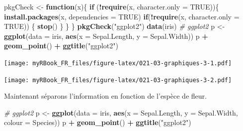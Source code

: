 \documentclass[]{book}
\newenvironment{Shaded}{\begin{snugshade}}{\end{snugshade}}
\newcommand{\CommentTok}[1]{\textcolor[rgb]{0.56,0.35,0.01}{\textit{#1}}}
\newcommand{\ControlFlowTok}[1]{\textcolor[rgb]{0.13,0.29,0.53}{\textbf{#1}}}
\newcommand{\DataTypeTok}[1]{\textcolor[rgb]{0.13,0.29,0.53}{#1}}
\newcommand{\DecValTok}[1]{\textcolor[rgb]{0.00,0.00,0.81}{#1}}
\newcommand{\KeywordTok}[1]{\textcolor[rgb]{0.13,0.29,0.53}{\textbf{#1}}}
\newcommand{\NormalTok}[1]{#1}
\newcommand{\OperatorTok}[1]{\textcolor[rgb]{0.81,0.36,0.00}{\textbf{#1}}}
\newcommand{\OtherTok}[1]{\textcolor[rgb]{0.56,0.35,0.01}{#1}}
\newcommand{\StringTok}[1]{\textcolor[rgb]{0.31,0.60,0.02}{#1}}
\begin{document}
\begin{Shaded}
\begin{Highlighting}[]
\NormalTok{pkgCheck <-}\StringTok{ }\ControlFlowTok{function}\NormalTok{(x)\{ }
    \ControlFlowTok{if}\NormalTok{ (}\OperatorTok{!}\KeywordTok{require}\NormalTok{(x, }\DataTypeTok{character.only =} \OtherTok{TRUE}\NormalTok{))\{}
        \KeywordTok{install.packages}\NormalTok{(x, }\DataTypeTok{dependencies =} \OtherTok{TRUE}\NormalTok{)}
        \ControlFlowTok{if}\NormalTok{(}\OperatorTok{!}\KeywordTok{require}\NormalTok{(x, }\DataTypeTok{character.only =} \OtherTok{TRUE}\NormalTok{)) \{}
            \KeywordTok{stop}\NormalTok{()}
\NormalTok{        \}}
\NormalTok{    \}}
\NormalTok{\}}
\KeywordTok{pkgCheck}\NormalTok{(}\StringTok{"ggplot2"}\NormalTok{)}
\KeywordTok{data}\NormalTok{(iris)}
\CommentTok{# ggplot2}
\NormalTok{p <-}\StringTok{ }\KeywordTok{ggplot}\NormalTok{(}\DataTypeTok{data =}\NormalTok{ iris, }\KeywordTok{aes}\NormalTok{(}\DataTypeTok{x =}\NormalTok{ Sepal.Length, }\DataTypeTok{y =}\NormalTok{ Sepal.Width))}
\NormalTok{p }\OperatorTok{+}\StringTok{ }\KeywordTok{geom_point}\NormalTok{() }\OperatorTok{+}\StringTok{ }\KeywordTok{ggtitle}\NormalTok{(}\StringTok{"ggplot2"}\NormalTok{)}
\end{Highlighting}
\end{Shaded}

\texttt{[image: myRBook\_FR\_files/figure-latex/021-03-graphiques-3-1.pdf]}

\begin{Shaded}
\end{Shaded}

\texttt{[image: myRBook\_FR\_files/figure-latex/021-03-graphiques-3-2.pdf]}

Maintenant séparons l'information en fonction de l'espèce de fleur.

\begin{Shaded}
\begin{Highlighting}[]
\CommentTok{# ggplot2}
\NormalTok{p <-}\StringTok{ }\KeywordTok{ggplot}\NormalTok{(}\DataTypeTok{data =}\NormalTok{ iris, }\KeywordTok{aes}\NormalTok{(}\DataTypeTok{x =}\NormalTok{ Sepal.Length, }\DataTypeTok{y =}\NormalTok{ Sepal.Width, }\DataTypeTok{colour =}\NormalTok{ Species))}
\NormalTok{p }\OperatorTok{+}\StringTok{ }\KeywordTok{geom_point}\NormalTok{() }\OperatorTok{+}\StringTok{ }\KeywordTok{ggtitle}\NormalTok{(}\StringTok{"ggplot2"}\NormalTok{)}
\end{Highlighting}
\end{Shaded}
\end{document}
